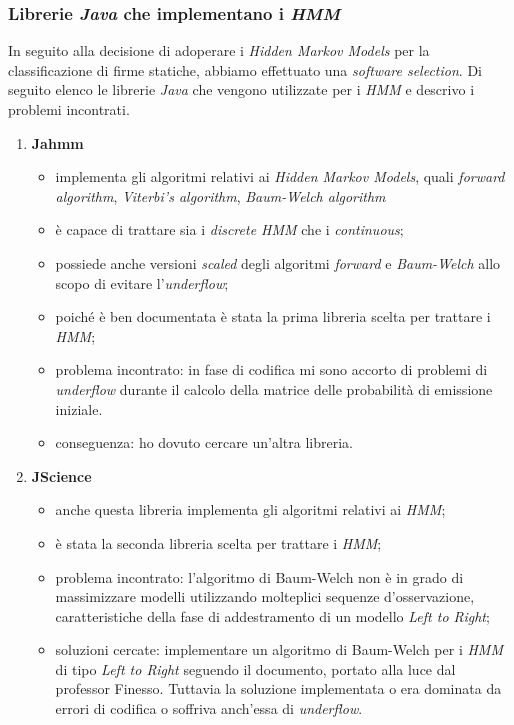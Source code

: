 \subsubsection*{Librerie \emph{Java} che implementano i \emph{HMM}}
\label{3.3.3.5}
In seguito alla decisione di adoperare i \emph{Hidden Markov Models} per la classificazione di firme statiche, abbiamo effettuato una \emph{software selection}. Di seguito elenco le librerie \emph{Java} che vengono utilizzate per i \emph{HMM} e descrivo i problemi incontrati.
\begin{enumerate}
\item\textbf{Jahmm}
	\begin{itemize}
	\item implementa gli algoritmi relativi ai \emph{Hidden Markov Models}, quali \emph{forward algorithm}, \emph{Viterbi's algorithm}, \emph{Baum-Welch algorithm}
	\item è capace di trattare sia i \emph{discrete HMM} che i \emph{continuous};
	\item possiede anche versioni \emph{scaled} degli algoritmi \emph{forward} e \emph{Baum-Welch} allo scopo di evitare l'\emph{underflow};
	\item poiché è ben documentata è stata la prima libreria scelta per trattare i \emph{HMM};
	\item problema incontrato: in fase di codifica mi sono accorto di problemi  di \emph{underflow} durante il calcolo della matrice delle probabilità di emissione iniziale.
	\item conseguenza: ho dovuto cercare un'altra libreria.
	\end{itemize}
\item\textbf{JScience}
	\begin{itemize}
	\item anche questa libreria implementa gli algoritmi relativi ai \emph{HMM};
	\item è stata la seconda libreria scelta per trattare i \emph{HMM};
	\item problema incontrato: l'algoritmo di Baum-Welch non è in grado di massimizzare modelli utilizzando molteplici sequenze d'osservazione, caratteristiche della fase di addestramento di un modello \emph{Left to Right};
	\item soluzioni cercate: implementare un algoritmo di Baum-Welch per i \emph{HMM} di tipo \emph{Left to Right} seguendo il documento\cite{9}, portato alla luce dal professor Finesso. Tuttavia la soluzione implementata o era dominata da errori di codifica o soffriva anch'essa di \emph{underflow}.

\end{itemize}
\end{enumerate}
